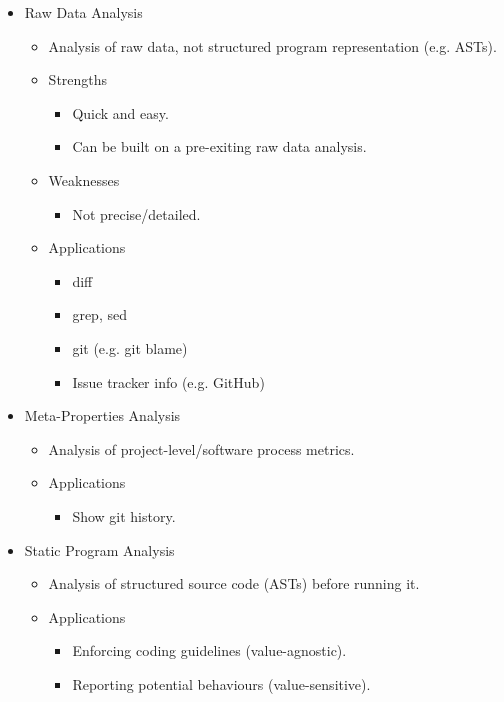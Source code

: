 \documentclass{article}
\begin{document}
\begin{itemize}
    \item Raw Data Analysis
    \begin{itemize}
        \item Analysis of raw data, not structured program representation (e.g. ASTs).
        \item Strengths
        \begin{itemize}
            \item Quick and easy.
            \item Can be built on a pre-exiting raw data analysis.
        \end{itemize}
        \item Weaknesses
        \begin{itemize}
            \item Not precise/detailed.
        \end{itemize}
        \item Applications
        \begin{itemize}
            \item diff
            \item grep, sed
            \item git (e.g. git blame)
            \item Issue tracker info (e.g. GitHub)
        \end{itemize}
    \end{itemize}
    \item Meta-Properties Analysis
    \begin{itemize}
        \item Analysis of project-level/software process metrics.
        \item Applications
        \begin{itemize}
            \item Show git history.
        \end{itemize}
    \end{itemize}
    \item Static Program Analysis
    \begin{itemize}
        \item Analysis of structured source code (ASTs) before running it.
        \item Applications
        \begin{itemize}
            \item Enforcing coding guidelines (value-agnostic).
            \item Reporting potential behaviours (value-sensitive).

\end{itemize}
\end{itemize}
\end{itemize}
\end{document}
